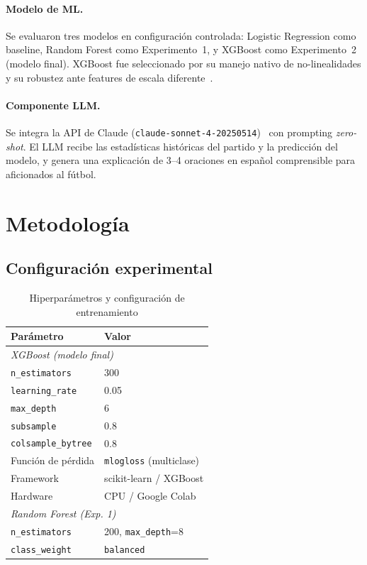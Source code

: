 \documentclass[10pt,twocolumn]{article}
\begin{document}
\paragraph{Modelo de ML.}
Se evaluaron tres modelos en configuración controlada:
Logistic Regression como baseline, Random Forest como
Experimento~1, y XGBoost como Experimento~2 (modelo final).
XGBoost fue seleccionado por su manejo nativo de no-linealidades
y su robustez ante features de escala diferente~\cite{chen2016}.

\paragraph{Componente LLM.}
Se integra la API de Claude (\texttt{claude-sonnet-4-20250514})~\cite{anthropic2024}
con prompting \textit{zero-shot}. El LLM recibe las estadísticas
históricas del partido y la predicción del modelo, y genera una
explicación de 3--4 oraciones en español comprensible para
aficionados al fútbol.

\section{Metodología}

\subsection{Configuración experimental}

\begin{table}[H]
\centering
\caption{Hiperparámetros y configuración de entrenamiento}
\label{tab:hparams}
\begin{tabularx}{\columnwidth}{lX}
\toprule
\textbf{Parámetro} & \textbf{Valor} \\
\midrule
\multicolumn{2}{l}{\textit{XGBoost (modelo final)}} \\
\texttt{n\_estimators} & 300 \\
\texttt{learning\_rate} & 0.05 \\
\texttt{max\_depth} & 6 \\
\texttt{subsample} & 0.8 \\
\texttt{colsample\_bytree} & 0.8 \\
Función de pérdida & \texttt{mlogloss} (multiclase) \\
Framework & scikit-learn / XGBoost \\
Hardware & CPU / Google Colab \\
\midrule
\multicolumn{2}{l}{\textit{Random Forest (Exp. 1)}} \\
\texttt{n\_estimators} & 200, \texttt{max\_depth}=8 \\
\texttt{class\_weight} & \texttt{balanced} \\
\bottomrule
\end{tabularx}
\end{table}
\end{document}
